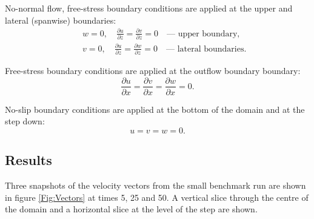 
No-normal flow, free-stress boundary conditions are applied at the upper and lateral
(spanwise) boundaries:
\begin{eqnarray*}
&&w=0,\quad \frac{\partial u}{\partial z} = \frac{\partial v}{\partial z} = 0 \quad\textrm{--- upper boundary},\\
&&v=0,\quad \frac{\partial u}{\partial z} = \frac{\partial w}{\partial z} = 0 \quad\textrm{--- lateral boundaries}.
\end{eqnarray*}

Free-stress boundary conditions are applied at the outflow boundary boundary:
\begin{equation*}
\frac{\partial u}{\partial x} = \frac{\partial v}{\partial x} = \frac{\partial w}{\partial x} = 0.
\end{equation*}

No-slip boundary conditions are applied at the bottom of the domain and at the step down:
\begin{equation*}
u=v=w=0.
\end{equation*}




\subsection{Results}
Three snapshots of the velocity vectors from the small benchmark run
are shown in figure \ref{Fig:Vectors} at times
5, 25 and 50. A vertical slice through the centre of the domain and a horizontal slice
at the level of the step are shown.




